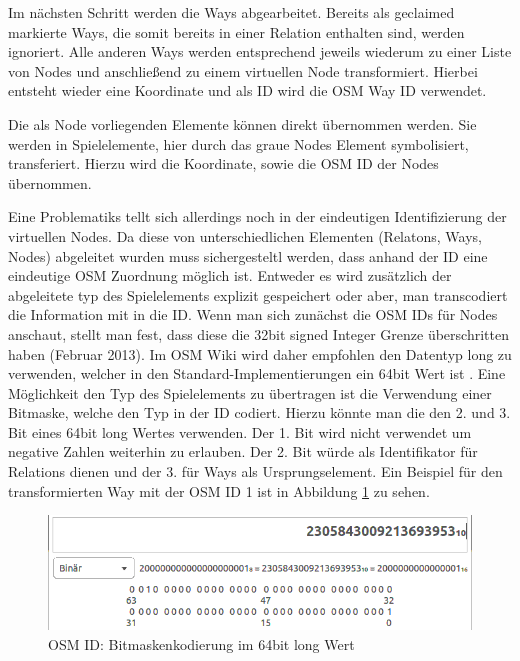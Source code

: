 Im nächsten Schritt werden die Ways abgearbeitet. Bereits als \glqq geclaimed\grqq{} markierte Ways, die somit bereits in einer Relation enthalten sind, werden ignoriert. Alle anderen Ways werden entsprechend jeweils wiederum zu einer Liste von Nodes und anschließend zu einem virtuellen Node transformiert. Hierbei entsteht wieder eine Koordinate und als ID wird die OSM Way ID verwendet.

Die als Node vorliegenden Elemente können direkt übernommen werden. Sie werden in Spielelemente, hier durch das graue Nodes Element symbolisiert, transferiert. Hierzu wird die Koordinate, sowie die OSM ID der Nodes übernommen.

Eine Problematiks tellt sich allerdings noch in der eindeutigen Identifizierung der virtuellen Nodes. Da diese von unterschiedlichen Elementen (Relatons, Ways, Nodes) abgeleitet wurden muss sichergesteltl werden, dass anhand der ID eine eindeutige OSM Zuordnung möglich ist.
Entweder es wird zusätzlich der abgeleitete typ des Spielelements explizit gespeichert oder aber, man transcodiert die Information mit in die ID.
Wenn man sich zunächst die OSM IDs für Nodes anschaut, stellt man fest, dass diese die 32bit signed Integer Grenze überschritten haben (Februar 2013). Im OSM Wiki wird daher empfohlen den Datentyp long zu verwenden, welcher in den Standard-Implementierungen ein 64bit Wert ist \cite{OSM.2013b}.
Eine Möglichkeit den Typ des Spielelements zu übertragen ist die Verwendung einer Bitmaske, welche den Typ in der ID codiert. Hierzu könnte man die den 2. und 3. Bit eines 64bit long Wertes verwenden. Der 1. Bit wird nicht verwendet um negative Zahlen weiterhin zu erlauben. Der 2. Bit würde als Identifikator für Relations dienen und der 3. für Ways als Ursprungselement. Ein Beispiel für den transformierten Way mit der OSM ID 1 ist in Abbildung \ref{img:ch5_img03_bitmask} zu sehen.

\begin{figure}[H]
\begin{center}
\includegraphics[width=120mm]{images/ch5_img03_bitmask.png}
\caption{OSM ID: Bitmaskenkodierung im 64bit long Wert}
\label{img:ch5_img03_bitmask}
\end{center}
\end{figure}


